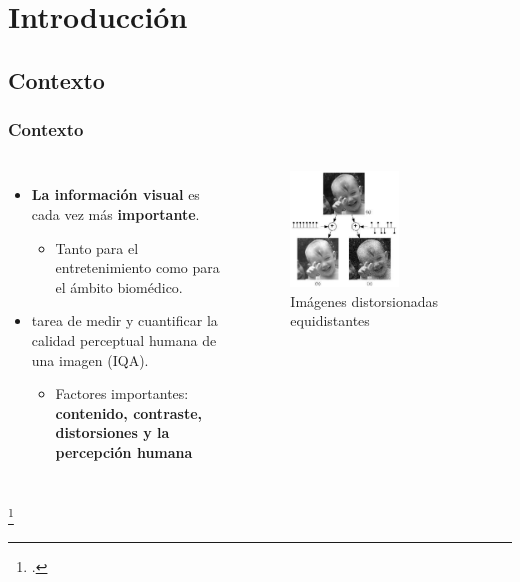 \section[Introducción]{Introducción}
\subsection[Contexto]{Contexto}
\begin{frame}
    \frametitle{Contexto}
    \begin{columns}
    \begin{itemize}
      \item \textbf{La información visual} es cada vez más \textbf{importante}.
        \begin{itemize}
          \item Tanto para el entretenimiento como para el ámbito biomédico.
        \end{itemize}
      \item{tarea de medir y cuantificar} la calidad perceptual humana de una imagen (IQA). 
        \begin{itemize}
          \item Factores importantes: \textbf{contenido, contraste, distorsiones y la percepción humana}
        \end{itemize}
    \end{itemize}
    \begin{figure}
      \begin{center}
        \includegraphics[width=0.60\textwidth]{imagenes/chapter1/failure_minkowski_metric}
      \end{center}
      \caption{Imágenes distorsionadas equidistantes\footnotemark}
    \end{figure}
  \end{columns}
  \vspace{-.2cm}
  \footcitetext{MinkowskiFailure}
\end{frame}

